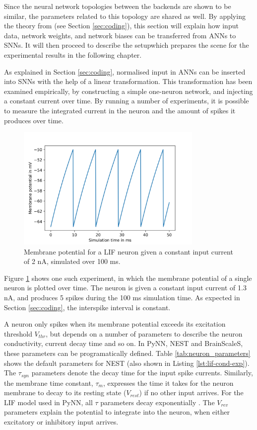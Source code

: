 Since the neural network topologies between the backends are shown to be similar,
the parameters related to this topology are shared as well.
By applying the theory from \textcite{Rueckauer2017} (see Section
\ref{sec:coding}), this section will explain how input data, network weights,
and network biases can be transferred from \glspl{ANN} to \glspl{SNN}.
It will then proceed to describe the setupwhich prepares the scene for the
experimental results in the following chapter.

As explained in Section \ref{sec:coding}, normalised input in \glspl{ANN} can
be inserted into \glspl{SNN} with the help of a linear transformation.
This transformation has been examined empirically, by constructing a simple 
one-neuron network, and injecting a constant current over time.
By running a number of experiments, it is possible to measure the integrated
current in the neuron and the amount of spikes it produces over time.

\begin{figure}
  \centering
  \includegraphics[width=0.8\textwidth]{images/membrane.png}
  \caption{Membrane potential for a LIF neuron given a constant input current of
  2 nA, simulated over 100 ms.}
  \label{fig:membrane}
\end{figure}

Figure \ref{fig:membrane} shows one such experiment, in which the membrane
potential of a single neuron is plotted over time.
The neuron is given a constant input current of 1.3 nA, and 
produces 5 spikes during the 100 ms simulation time. 
As expected in Section \ref{sec:coding}, the interspike interval is constant.

A neuron only spikes when its membrane potential exceeds its excitation threshold
$V_{thr}$, but depends on a number of parameters to describe the neuron
conductivity, current decay time and so on.
In PyNN, NEST and BrainScaleS, these parameters can be programatically
defined. Table \ref{tab:neuron_parameters} shows the default parameters for
NEST (also shown in Listing \ref{lst:lif-cond-exp}).
The $\tau_{syn}$ parameters denote the decay time for the input spike currents. 
Similarly, the membrane time constant, $\tau_m$, expresses the time it takes for the
neuron membrane to decay to its resting state ($V_{rest}$) if no other
input arrives. 
For the LIF model used in PyNN,
all $\tau$ parameters decay exponentially \cite{Davison2009}.
The $V_{rev}$ parameters explain the potential to integrate into the neuron,
when either excitatory or inhibitory input arrives. 

